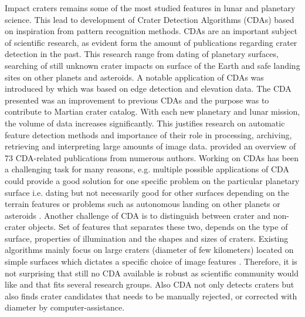 \documentclass[11pt]{article}
\begin{document}

Impact craters remains some of the most studied features in lunar and planetary science. This lead to development of Crater Detection Algorithms (CDAs) based on inspiration from pattern recognition methods. CDAs are an important subject of scientific research, as evident form the amount of publications regarding crater detection in the past. This research range from dating of planetary surfaces, searching of still unknown crater impacts on surface of the Earth and safe landing sites on other planets and asteroids. A notable application of CDAs was introduced by \cite{salamuniccar2010method} which was based on edge detection and elevation data. The CDA presented was an improvement to previous CDAs and the purpose was to contribute to Martian crater catalog. With each new planetary and lunar mission, the volume of data increases significantly. This justifies research on automatic feature detection methods and importance of their role in processing, archiving, retrieving and interpreting large amounts of image data. \cite{salamuniccar2010method} provided an overview of 73 CDA-related publications from numerous authors. Working on CDAs has been a challenging task for many reasons, e.g. multiple possible applications of CDA could provide a good solution for one specific problem on the particular planetary surface i.e. dating \cite{sawabe_2006} but not necessarily good for other surfaces depending on the terrain features or problems such as autonomous landing on other planets or asteroids \cite{leroy2001crater}. Another challenge of CDA is to distinguish between crater and non-crater objects. Set of features that separates these two, depends on the type of surface, properties of illumination and the shapes and sizes of craters. Existing algorithms mainly focus on large craters (diameter of few kilometers) located on simple surfaces which dictates a specific choice of image features \cite{bandeira2010automatic}. Therefore, it is not surprising that still no CDA available is robust as scientific community would like and that fits several research groups. Also CDA not only detects craters but also finds crater candidates that needs to be manually rejected, or corrected with diameter by computer-assistance. 
\end{document}
